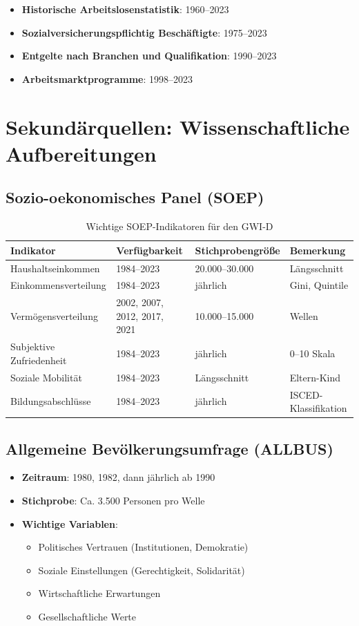 \begin{itemize}
\item \textbf{Historische Arbeitslosenstatistik}: 1960--2023
\item \textbf{Sozialversicherungspflichtig Beschäftigte}: 1975--2023
\item \textbf{Entgelte nach Branchen und Qualifikation}: 1990--2023
\item \textbf{Arbeitsmarktprogramme}: 1998--2023
\end{itemize}

\section{Sekundärquellen: Wissenschaftliche Aufbereitungen}

\subsection{Sozio-oekonomisches Panel (SOEP)}

\begin{table}[ht]
\centering
\begin{tabular}{llll}
\toprule
\textbf{Indikator} & \textbf{Verfügbarkeit} & \textbf{Stichprobengröße} & \textbf{Bemerkung} \\
\midrule
Haushaltseinkommen & 1984--2023 & 20.000--30.000 & Längsschnitt \\
Einkommensverteilung & 1984--2023 & jährlich & Gini, Quintile \\
Vermögensverteilung & 2002, 2007, 2012, 2017, 2021 & 10.000--15.000 & Wellen \\
Subjektive Zufriedenheit & 1984--2023 & jährlich & 0--10 Skala \\
Soziale Mobilität & 1984--2023 & Längsschnitt & Eltern-Kind \\
Bildungsabschlüsse & 1984--2023 & jährlich & ISCED-Klassifikation \\
\bottomrule
\end{tabular}
\caption{Wichtige SOEP-Indikatoren für den GWI-D}
\label{tab:soep-indikatoren}
\end{table}

\subsection{Allgemeine Bevölkerungsumfrage (ALLBUS)}

\begin{itemize}
\item \textbf{Zeitraum}: 1980, 1982, dann jährlich ab 1990
\item \textbf{Stichprobe}: Ca. 3.500 Personen pro Welle
\item \textbf{Wichtige Variablen}:
  \begin{itemize}
  \item Politisches Vertrauen (Institutionen, Demokratie)
  \item Soziale Einstellungen (Gerechtigkeit, Solidarität)
  \item Wirtschaftliche Erwartungen
  \item Gesellschaftliche Werte
  \end{itemize}
\end{itemize}

